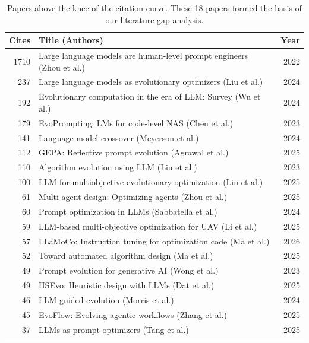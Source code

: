 \documentclass[sigconf,nonacm]{acmart}
\begin{document}
\begin{table}[h]
\caption{Papers above the knee of the citation curve. These 18 papers formed the basis of our literature gap analysis.}
\label{tab:knee-papers}
\small
\begin{tabular}{rp{5.5cm}r}
\toprule
\textbf{Cites} & \textbf{Title (Authors)} & \textbf{Year} \\
\midrule
1710 & Large language models are human-level prompt engineers (Zhou et al.) & 2022 \\
237  & Large language models as evolutionary optimizers (Liu et al.) & 2024 \\
192  & Evolutionary computation in the era of LLM: Survey (Wu et al.) & 2024 \\
179  & EvoPrompting: LMs for code-level NAS (Chen et al.) & 2023 \\
141  & Language model crossover (Meyerson et al.) & 2024 \\
112  & GEPA: Reflective prompt evolution (Agrawal et al.) & 2025 \\
110  & Algorithm evolution using LLM (Liu et al.) & 2023 \\
100  & LLM for multiobjective evolutionary optimization (Liu et al.) & 2025 \\
61   & Multi-agent design: Optimizing agents (Zhou et al.) & 2025 \\
60   & Prompt optimization in LLMs (Sabbatella et al.) & 2024 \\
59   & LLM-based multi-objective optimization for UAV (Li et al.) & 2025 \\
57   & LLaMoCo: Instruction tuning for optimization code (Ma et al.) & 2026 \\
52   & Toward automated algorithm design (Ma et al.) & 2025 \\
49   & Prompt evolution for generative AI (Wong et al.) & 2023 \\
49   & HSEvo: Heuristic design with LLMs (Dat et al.) & 2025 \\
46   & LLM guided evolution (Morris et al.) & 2024 \\
45   & EvoFlow: Evolving agentic workflows (Zhang et al.) & 2025 \\
37   & LLMs as prompt optimizers (Tang et al.) & 2025 \\
\bottomrule
\end{tabular}
\end{table}
\end{document}
